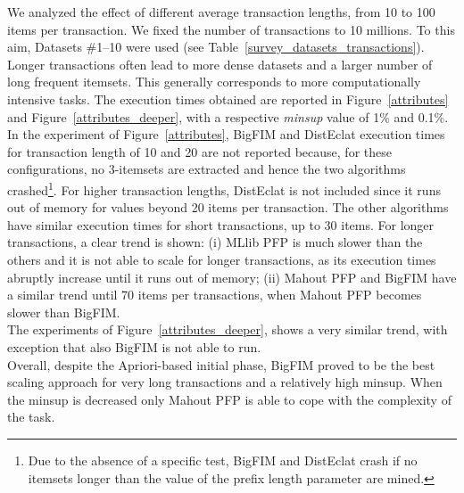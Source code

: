 We analyzed the effect of different average transaction lengths,
from 10 to 100 items per transaction.
We fixed the number of transactions to 10 millions.
To this aim, Datasets \#1--10 were used (see Table~\ref{survey_datasets_transactions}).
Longer transactions often lead to more dense datasets and a larger number of long frequent itemsets.
This generally corresponds to more computationally intensive tasks.
The execution times obtained are reported in Figure~\ref{attributes} and Figure~\ref{attributes_deeper}, with a respective {\it minsup} value of 1\% and 0.1\%.
In the experiment of Figure~\ref{attributes}, BigFIM and DistEclat execution times for transaction length of 10 and 20 are not reported because, for these configurations, no 3-itemsets are extracted and hence the two algorithms crashed\footnote{Due to the absence of a specific test, BigFIM and DistEclat crash
if no itemsets longer than the value of the prefix length parameter are mined.}.
For higher transaction lengths, DistEclat is not included since it runs out of memory
for values beyond 20 items per transaction.
The other algorithms have similar execution times for short transactions,
up to 30 items.
For longer transactions, a clear trend is shown:
(i) MLlib PFP is much slower than the others
and it is not able to scale for longer transactions,
as its execution times abruptly increase until it runs out of memory;
(ii) Mahout PFP and BigFIM have a similar trend until 70 items per transactions,
when Mahout PFP becomes slower than BigFIM.\\
The experiments of Figure~\ref{attributes_deeper}, shows a very similar trend, with exception that also BigFIM is not able to run.\\
Overall, despite the Apriori-based initial phase,
BigFIM proved to be the best scaling approach for very long transactions and a relatively high minsup. When the minsup is decreased only Mahout PFP 
is able to cope with the complexity of the task.\\


